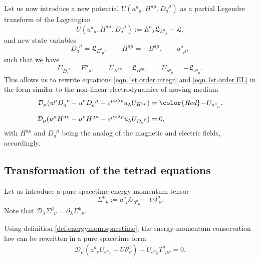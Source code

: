 \documentclass[
10pt, %
a4paper, %
oneside, %
headinclude,footinclude, %
BCOR5mm, %
]{scrartcl}
\newcommand{\pd}{\partial}
\newcommand{\tetr}[2]{a^{#1}_{\phantom{#1}#2}}
\newcommand{\D}[1]{\mathcal{D}_{#1}} %
\newcommand{\Tors}[2]{T^{#1}_{\phantom{a}#2}}
\newcommand{\ET}[2]{E^{#1}_{\phantom{#1}#2}}	%
\newcommand{\eT}[2]{D_{#1}^{\phantom{#1}#2}}	%
\newcommand{\BT}[2]{B^{#1#2}}	%
\newcommand{\hT}[2]{H^{#1#2}}	%
\newcommand{\LagBE}{\mathfrak{L}}%
\newcommand{\veps}{\varepsilon}
\newcommand{\EM}[2]{\Sigma^{#1}_{\phantom{#1}#2}}
\begin{document}
Let us now introduce a new potential $ U(\tetr{a}{\mu},\hT{a}{\mu},\eT{a}{\mu}) $ as a partial 
Legendre transform of the Lagrangian
\begin{equation}
 U(\tetr{a}{\mu},\hT{a}{\mu},\eT{a}{\mu}) := \ET{a}{\lambda}\LagBE_{\ET{a}{\lambda}} - \LagBE,
\end{equation}
and new state variables
\begin{equation}
\eT{a}{\mu} = \LagBE_{\ET{a}{\mu}}, \qquad \hT{a}{\mu} = -\BT{a}{\mu}, \qquad \tetr{a}{\mu},
\end{equation}
such that we have
\begin{equation}
U_{\eT{a}{\mu}} = \ET{a}{\mu}, \qquad U_{\hT{a}{\mu}} = \LagBE_{\BT{a}{\mu}},
\qquad U_{\tetr{a}{\mu}} = - \LagBE_{\tetr{a}{\mu}}.
\end{equation}
This allows us to rewrite equations \eqref{eqn.1st.order.integr} and \eqref{eqn.1st.order.EL} in 
the form similar to the non-linear 
electrodynamics of moving medium~\cite{Obukhov2008,DPRZ2017,Hohmann2018a}
\begin{subequations}
	\begin{align}
		\D{\mu}(u^\mu\eT{a}{\nu} - u^\nu\eT{a}{\mu} + \veps^{\mu\nu\lambda\rho}u_\lambda 
		U_{\hT{a}{\rho}})
		& ={\color{Red}\bm{-}}U_{\tetr{a}{\mu}},\\[2mm]
		\D{\mu}(u^\mu \hT{a}{\nu} - u^\nu\hT{a}{\mu} - 
		\veps^{\mu\nu\lambda\rho}u_\lambda 
		U_{\eT{a}{\rho}}) 
		& = 0,
\end{align}
\end{subequations}
with $\hT{a}{\mu}$ and $\eT{a}{\mu}$ being the analog of the magnetic and electric fields, 
accordingly.




\subsection{Transformation of the tetrad equations}

Let us introduce a pure spacetime energy-momentum tensor
\begin{equation}\label{def.energymom.spacetime}
\EM{\mu}{\nu} := \tetr{a}{\nu} U_{\tetr{a}{\mu}} - U \delta^\mu_{\ \nu}.
\end{equation}
Note that $ \D{\lambda} \EM{\mu}{\nu} = \pd_\lambda\EM{\mu}{\nu} $. 

Using definition \eqref{def.energymom.spacetime}, the energy-momentum conservation law can be 
rewritten in a pure spacetime form
\begin{equation}
\D{\mu} (\tetr{a}{\nu} U_{\tetr{a}{\mu}} - U \delta^\mu_{\ \nu}) - U_{\tetr{a}{\mu}} 
\Tors{a}{\mu\nu} = 0.
\end{equation}
\end{document}
